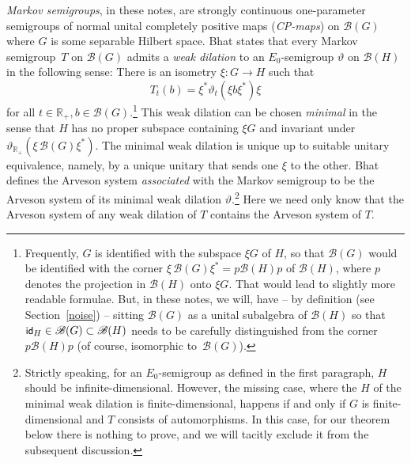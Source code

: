 \documentclass[pdftex]{sigma}%
\newcommand{\msf}[1]{\text{\small $\sf{#1}$}}
\newcommand{\eus}[1]{\mathscr{#1}}
\newcommand{\bb}[1]{\mathbb{#1}}
\newcommand{\vt}{\vartheta}
\DeclareMathOperator{\id}{\normalfont\msf{id}}
\newcommand{\R}{\bb{R}}
\newcommand{\sB}{\eus{B}}
\numberwithin{equation}{section}
\newcommand{\bemp}{\begin{emp}}
\newcommand{\eemp}{\end{emp}}
\begin{document}
\bemp \label{WD}
\emph{Markov semigroups}, in these notes, are strongly continuous one-parameter semigroups of normal unital completely positive maps (\emph{CP-maps}) on $\sB(G)$ where $G$ is some separable Hilbert space. Bhat \cite[Theorem~4.7]{Bha96} states that every Markov semigroup~$T$ on $\sB(G)$ admits a \emph{weak dilation} to an $E_0$-semigroup $\vt$ on $\sB(H)$ in the following sense: There is an isometry $\xi\colon G\rightarrow H$ such that
\[
T_t(b)=\xi^*\vt_t(\xi b\xi^*)\xi
\]
for all $t\in\R_+,b\in\sB(G)$.\footnote{Frequently, $G$ is identified with the subspace $\xi G$ of $H$, so that $\sB(G)$ would be identified with the corner $\xi\,\sB(G)\xi^*=p\sB(H)p$ of $\sB(H)$, where $p$ denotes the projection in $\sB(H)$ onto $\xi G$. That would lead to slightly more readable formulae. But, in these notes, we will, have -- by definition (see Section~\ref{noise}) -- sitting $\sB(G)$ as a unital subalgebra of $\sB(H)$ so that $\id_H\in\sB(G)\subset\sB(H)$ needs to be carefully distinguished from the corner $p\sB(H)p$ (of course, isomorphic to~$\sB(G)$).}
This weak dilation can be chosen \emph{minimal} in the sense that $H$ has no proper subspace containing $\xi G$ and invariant under $\vt_{\R_+}(\xi\,\sB(G)\xi^*)$. The minimal weak dilation is unique up to suitable unitary equivalence, namely, by a unique unitary that sends one $\xi$ to the other. Bhat \cite{Bha96} defines the Arveson system \emph{associated} with the Markov semigroup to be the Arveson system of its minimal weak dilation $\vt$.\footnote{Strictly speaking, for an $E_0$-semigroup as defined in the first paragraph, $H$ should be infinite-dimensional. However, the missing case, where the $H$ of the minimal weak dilation is finite-dimensional, happens if and only if $G$ is finite-dimensional and $T$ consists of automorphisms. In this case, for our theorem below there is nothing to prove, and we will tacitly exclude it from the subsequent discussion.} Here we need only know that the Arveson system of any weak dilation of $T$ contains the Arveson system of $T$.
\eemp
\end{document}
